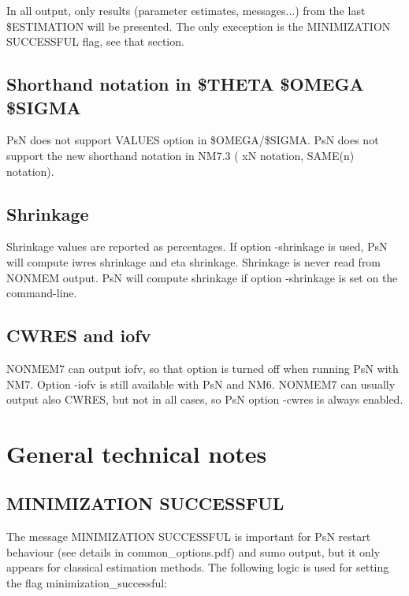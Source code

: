 In all output, only results (parameter estimates, messages...) from the last \$ESTIMATION will be presented. The only exeception is the MINIMIZATION SUCCESSFUL flag, see that section.

\subsection{Shorthand notation in \$THETA \$OMEGA \$SIGMA}
PsN does not support VALUES option in \$OMEGA/\$SIGMA. 
PsN does not support the new shorthand notation in NM7.3 ( xN notation, SAME(n) notation).

\subsection{Shrinkage}

Shrinkage values are reported as percentages. If option -shrinkage is used, PsN will compute iwres shrinkage and eta shrinkage. 
Shrinkage is never read from NONMEM output. PsN will compute shrinkage if option -shrinkage is set on the command-line.

\subsection{CWRES and iofv}

NONMEM7 can output iofv, so that option is turned off when running PsN with NM7.
Option -iofv is still available with PsN and NM6.
NONMEM7 can usually output also CWRES, but not in all cases,
so PsN option -cwres is always enabled.




\section{General technical notes}

\subsection{MINIMIZATION SUCCESSFUL}

The message MINIMIZATION SUCCESSFUL is important for PsN restart behaviour (see details in common\_options.pdf) and sumo output, but it only appears for classical estimation methods. The following logic is used for setting the flag minimization\_successful:

